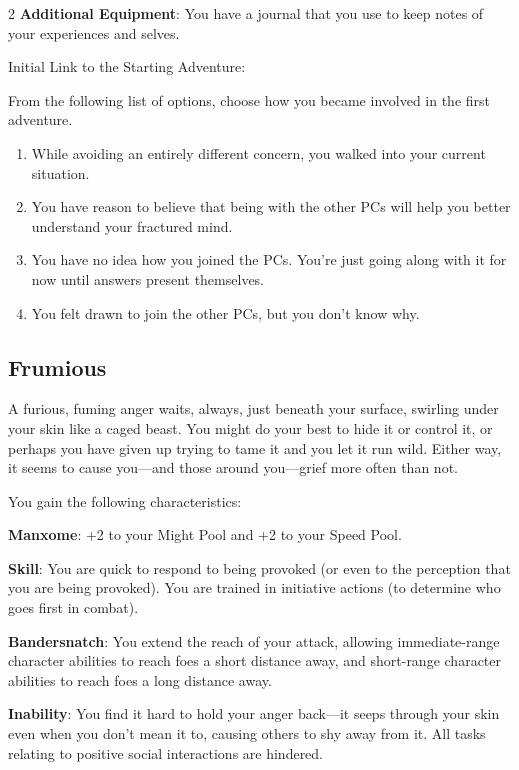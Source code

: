 \begin{multicols}{2}
\textbf{Additional Equipment}: You have a journal that you use to keep notes of your experiences and selves.

Initial Link to the Starting Adventure:

From the following list of options, choose how you became involved in the first adventure.
\begin{enumerate}
\item While avoiding an entirely different concern, you walked into your current situation.
\item You have reason to believe that being with the other PCs will help you better understand your fractured mind.
\item You have no idea how you joined the PCs. You’re just going along with it for now until answers present themselves.
\item You felt drawn to join the other PCs, but you don’t know why. 
\end{enumerate}

\subsection{Frumious}

A furious, fuming anger waits, always, just beneath your surface, swirling under your skin like a caged beast. You might do your best to hide it or control it, or perhaps you have given up trying to tame it and you let it run wild. Either way, it seems to cause you—and those around you—grief more often than not.

You gain the following characteristics:

\textbf{Manxome}: +2 to your Might Pool and +2 to your Speed Pool.

\textbf{Skill}: You are quick to respond to being provoked (or even to the perception that you are being provoked). You are trained in initiative actions (to determine who goes first in combat).

\textbf{Bandersnatch}: You extend the reach of your attack, allowing immediate-range character abilities to reach foes a short distance away, and short-range character abilities to reach foes a long distance away.

\textbf{Inability}: You find it hard to hold your anger back—it seeps through your skin even when you don’t mean it to, causing others to shy away from it. All tasks relating to positive social interactions are hindered.


\end{multicols}
